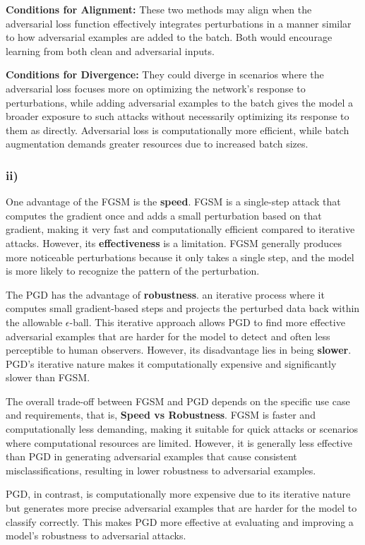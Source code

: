 \documentclass{article}
\begin{document}
\textbf{Conditions for Alignment:} These two methods may align when the adversarial loss function effectively integrates perturbations in a manner similar to how adversarial examples are added to the batch. Both would encourage learning from both clean and adversarial inputs.

\textbf{Conditions for Divergence:} They could diverge in scenarios where the adversarial loss focuses more on optimizing the network's response to perturbations, while adding adversarial examples to the batch gives the model a broader exposure to such attacks without necessarily optimizing its response to them as directly. Adversarial loss is computationally more efficient, while batch augmentation demands greater resources due to increased batch sizes.

\subsubsection*{ii)}

One advantage of the FGSM is the \textbf{speed}. FGSM is a single-step attack that computes the gradient once and adds a small perturbation based on that gradient, making it very fast and computationally efficient compared to iterative attacks. However, its \textbf{effectiveness} is a limitation. FGSM generally produces more noticeable perturbations because it only takes a single step, and the model is more likely to recognize the pattern of the perturbation.

The PGD has the advantage of \textbf{robustness}. an iterative process where it computes small gradient-based steps and projects the perturbed data back within the allowable 
$\epsilon$-ball. This iterative approach allows PGD to find more effective adversarial examples that are harder for the model to detect and often less perceptible to human observers. However, its disadvantage lies in being \textbf{slower}. PGD's iterative nature makes it computationally expensive and significantly slower than FGSM.

The overall trade-off between FGSM and PGD depends on the specific use case and requirements, that is, \textbf{Speed vs Robustness}. FGSM is faster and computationally less demanding, making it suitable for quick attacks or scenarios where computational resources are limited. However, it is generally less effective than PGD in generating adversarial examples that cause consistent misclassifications, resulting in lower robustness to adversarial examples.

PGD, in contrast, is computationally more expensive due to its iterative nature but generates more precise adversarial examples that are harder for the model to classify correctly. This makes PGD more effective at evaluating and improving a model's robustness to adversarial attacks.
\end{document}

